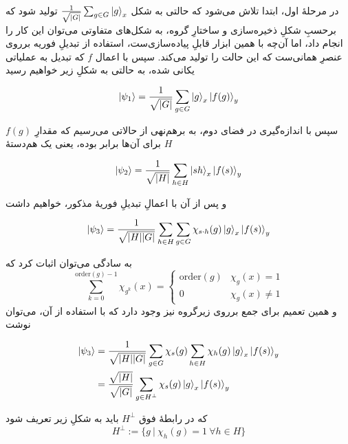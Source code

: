 \documentclass[a4paper,12pt]{article}
\begin{document}
در مرحلهٔ اول، ابتدا تلاش می‌شود که حالتی به شکل
\(\frac{1}{\sqrt{\abs{G}}}\sum_{g \in G} \ket{g}_x\)
تولید شود که برحسبِ شکلِ ذخیره‌سازی و ساختارِ گروه، به شکل‌های متفاوتی می‌توان این کار را انجام داد، اما آن‌چه با همین ابزار قابلِ پیاده‌سازی‌ست، استفاده از تبدیلِ فوریه برروی عنصرِ همانی‌ست که این حالت را تولید می‌کند. سپس با اعمال \(f\) که تبدیل به عملیاتی یکانی شده، به حالتی به شکلِ زیر خواهیم رسید

\begin{equation}
    \ket{\psi_1} = \frac{1}{\sqrt{\abs{G}}}\sum_{g \in G} \ket{g}_x\ket{f(g)}_y
\end{equation}

سپس با اندازه‌گیری در فضای دوم، به برهم‌نهی از حالاتی می‌رسیم که مقدارِ 
\(f(g)\)
برای آن‌ها برابر بوده، یعنی یک هم‌دستهٔ \(H\)

\begin{equation}
    \ket{\psi_2} = \frac{1}{\sqrt{\abs{H}}} \sum_{h \in H} \ket{sh}_x \ket{f(s)}_y
\end{equation}

و پس از آن با اعمالِ تبدیلِ فوریهٔ مذکور، خواهیم داشت

\begin{equation}
    \ket{\psi_3} = \frac{1}{\sqrt{\abs{H} \abs{G}}} \sum_{h \in H} \sum_{g \in G} \chi_{s \cdot h}(g)\ket{g}_x \ket{f(s)}_y
\end{equation}

به سادگی می‌توان اثبات کرد که 
\begin{equation}
    \sum_{k = 0}^{\mathrm{order}(g) - 1} \chi_{g^k}(x) = \begin{cases} \mathrm{order}(g) & \chi_g(x) = 1 \\
0 & \chi_g(x) \ne 1 \end{cases}
\end{equation}
و همین تعمیم برای جمع برروی زیرگروه نیز وجود دارد که با استفاده از آن، می‌توان نوشت 

\begin{align}
    \ket{\psi_3} &= \frac{1}{\sqrt{\abs{H} \abs{G}}} \sum_{g \in G} \chi_s(g) \sum_{h \in H} \chi_{h}(g)\ket{g}_x \ket{f(s)}_y \\
    &= \frac{\sqrt{\abs{H}}}{\sqrt{\abs{G}}} \sum_{g \in H^\perp} \chi_s(g) \ket{g}_x \ket{f(s)}_y
\end{align}

که در رابطهٔ فوق \(H^\perp\) باید به شکلِ زیر تعریف شود
\begin{equation}
    H^\perp := \{g ~|~ \chi_h(g) = 1 ~ \forall h \in H\}
\end{equation}
\end{document}
